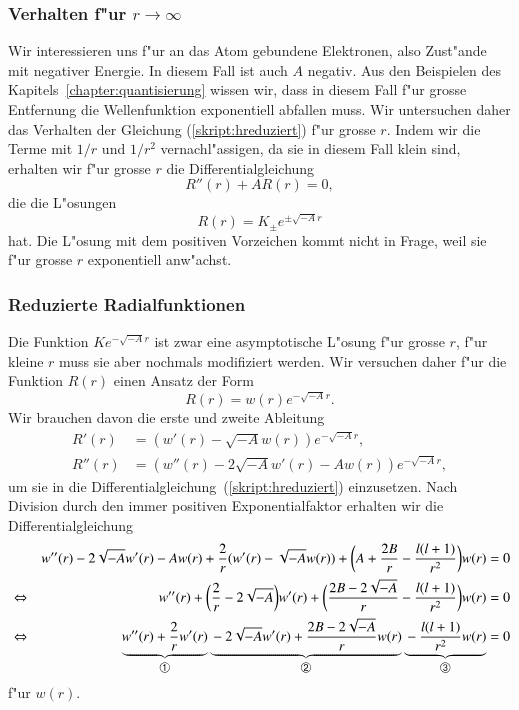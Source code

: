 \subsubsection{Verhalten f"ur $r\to\infty$}
Wir interessieren uns f"ur an das Atom gebundene Elektronen, also
Zust"ande mit negativer Energie.
In diesem Fall ist auch $A$ negativ.
Aus den Beispielen des Kapitels~\ref{chapter:quantisierung} wissen wir,
dass in diesem Fall f"ur grosse Entfernung die Wellenfunktion exponentiell
abfallen muss.
Wir untersuchen daher das Verhalten der Gleichung (\ref{skript:hreduziert})
f"ur grosse $r$.
Indem wir die Terme mit $1/r$ und $1/r^2$ vernachl"assigen, da sie in
diesem Fall klein sind, erhalten wir f"ur grosse $r$ die Differentialgleichung
\[
R''(r)+AR(r)=0,
\]
die die L"osungen
\[
R(r)=K_\pm e^{\pm\sqrt{-A}r}
\]
hat.
Die L"osung mit dem positiven Vorzeichen kommt nicht in Frage, weil
sie f"ur grosse $r$ exponentiell anw"achst.

\subsubsection{Reduzierte Radialfunktionen}
Die Funktion $Ke^{-\sqrt{-A}r}$ ist zwar eine asymptotische L"osung
f"ur grosse $r$, f"ur kleine $r$ muss sie aber nochmals modifiziert
werden.
Wir versuchen daher f"ur die Funktion $R(r)$ einen Ansatz der Form
\begin{equation}
R(r)=w(r)e^{-\sqrt{-A}r}.
\label{skript:Ransatz}
\end{equation}
Wir brauchen davon die erste und zweite Ableitung
\begin{align*}
R'(r)&=(w'(r)-\sqrt{-A}w(r))e^{-\sqrt{-A}r},
\\
R''(r)&=(w''(r)-2\sqrt{-A}w'(r)-Aw(r))e^{-\sqrt{-A}r},
\end{align*}
um sie in die Differentialgleichung~(\ref{skript:hreduziert}) einzusetzen.
Nach Division durch den immer positiven Exponentialfaktor
erhalten wir die Differentialgleichung
\begin{align}
&&
w''(r)-2\sqrt{-A}w'(r)-Aw(r)
+\frac2{r}(w'(r)-\sqrt{-A}w(r))
+\biggl(A+\frac{2B}r-\frac{l(l+1)}{r^2}\biggr)w(r)&=0
\notag
\\
&\Leftrightarrow&
w''(r)+\biggl(\frac{2}{r}-2\sqrt{-A}\biggr)w'(r)
+\biggl(\frac{2B-2\sqrt{-A}}{r}-\frac{l(l+1)}{r^2}\biggr)w(r)&=0
\notag
\\
&\Leftrightarrow&
\underbrace{
w''(r)+\frac{2}{r}w'(r)
}_{\text{\normalsize\ding{192}}}
\underbrace{\mathstrut-2\sqrt{-A}w'(r)
+\frac{2B-2\sqrt{-A}}{r} w(r)
}_{\text{\normalsize\ding{193}}}
\underbrace{\mathstrut-\frac{l(l+1)}{r^2}w(r)}_{\text{\normalsize\ding{194}}}&=0
\label{skript:wequation}
\end{align}
f"ur $w(r)$.

